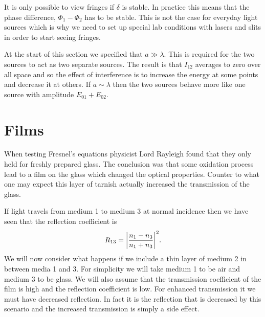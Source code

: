     It is only possible to view fringes if \(\delta\) is stable.
    In practice this means that the phase difference, \(\Phi_1 - \Phi_2\) has to be stable.
    This is not the case for everyday light sources which is why we need to set up special lab conditions with lasers and slits in order to start seeing fringes.
    
    At the start of this section we specified that \(a \gg \lambda\).
    This is required for the two sources to act as two separate sources.
    The result is that \(I_{12}\) averages to zero over all space and so the effect of interference is to increase the energy at some points and decrease it at others.
    If \(a \sim \lambda\) then the two sources behave more like one source with amplitude \(E_{01} + E_{02}\).
    
    \section{Films}
    When testing Fresnel's equations physicist Lord Rayleigh found that they only held for freshly prepared glass.
    The conclusion was that some oxidation process lead to a film on the glass which changed the optical properties.
    Counter to what one may expect this layer of tarnish actually increased the transmission of the glass.
    
    If light travels from medium 1 to medium 3 at normal incidence then we have seen that the reflection coefficient is
    \[R_{13} = \abs{\frac{n_1 - n_3}{n_1 + n_3}}^2.\]
    We will now consider what happens if we include a thin layer of medium 2 in between media 1 and 3.
    For simplicity we will take medium 1 to be air and medium 3 to be glass.
    We will also assume that the transmission coefficient of the film is high and the reflection coefficient is low.
    For enhanced transmission it we must have decreased reflection.
    In fact it is the reflection that is decreased by this scenario and the increased transmission is simply a side effect.
    
